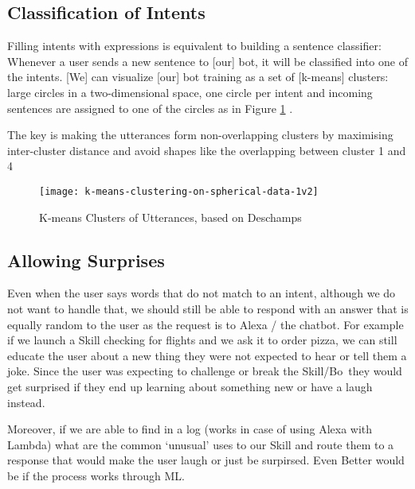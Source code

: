 \subsection*{Classification of Intents}
Filling intents with expressions is equivalent to building a sentence classifier: Whenever a user sends a new sentence to [our] bot, it will be classified into one of the intents. [We] can visualize [our] bot training as a set of [k-means] clusters: large circles  in a two-dimensional space, one circle per intent and incoming sentences are assigned to one of the circles as in Figure \ref{clusters} \cite{botbestbractis}.

The key is making the utterances form non-overlapping clusters by maximising inter-cluster distance and avoid shapes like the overlapping between cluster 1 and 4

\begin{figure}[H]
	\caption[K-means Clusters Example] {K-means Clusters of Utterances, based on Deschamps \cite{botbestbractis}}
	\label{clusters}
	\centering
	\texttt{[image: k-means-clustering-on-spherical-data-1v2]} 
\end{figure}


\subsection*{Allowing Surprises}
Even when the user says words that do not match to an intent, although we do not want to handle that, we should still be able to respond with an answer that is equally random to the user as the request is to Alexa / the chatbot. For example if we launch a Skill checking for flights and we ask it to order pizza, we can still educate the user about a new thing they were not expected to hear or tell them a joke. Since the user was expecting to challenge or break the Skill/Bo\, they would get surprised if they end up learning about something new or have a laugh instead.

Moreover, if we are able to find in a log (works in case of using Alexa with Lambda) what are the common `unusual' uses to our Skill and route them to a response that would make the user laugh or just be surpirsed. Even Better would be if the process works through ML.


